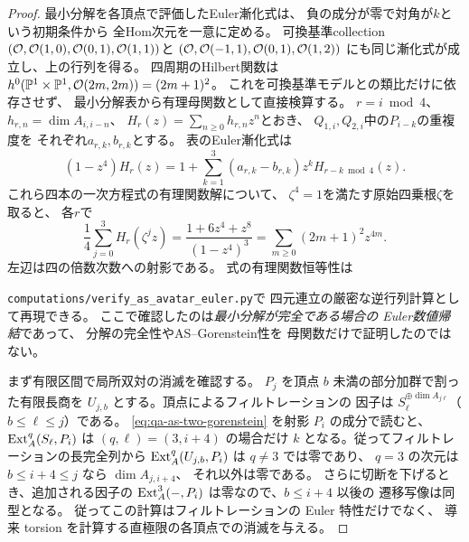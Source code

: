 \begin{proof}
最小分解を各頂点で評価したEuler漸化式は、
負の成分が零で対角が$k$という初期条件から
全Hom次元を一意に定める。
可換基準collection
$(\mathcal O,\mathcal O(1,0),\mathcal O(0,1),\mathcal O(1,1))$と
$(\mathcal O,\mathcal O(-1,1),\mathcal O(0,1),\mathcal O(1,2))$
にも同じ漸化式が成立し、上の行列を得る。
四周期のHilbert関数は
$h^0(\mathbb P^1\times\mathbb P^1,\mathcal O(2m,2m))=(2m+1)^2$。
これを可換基準モデルとの類比だけに依存させず、
最小分解表から有理母関数として直接検算する。
$r=i\bmod4$、$h_{r,n}=\dim A_{i,i-n}$、
$H_r(z)=\sum_{n\ge0}h_{r,n}z^n$とおき、
$Q_{1,i},Q_{2,i}$中の$P_{i-k}$の重複度を
それぞれ$a_{r,k},b_{r,k}$とする。
表のEuler漸化式は
\[
 (1-z^4)H_r(z)
 =1+\sum_{k=1}^3
 (a_{r,k}-b_{r,k})z^kH_{r-k\bmod4}(z).
 \tag{Euler4}\label{eq:qa-as-four-phase-euler}
\]
これら四本の一次方程式の有理関数解について、
$\zeta^4=1$を満たす原始四乗根$\zeta$を取ると、
各$r$で
\begin{equation}
 \frac14\sum_{j=0}^3H_r(\zeta^jz)
 =\frac{1+6z^4+z^8}{(1-z^4)^3}
 =\sum_{m\ge0}(2m+1)^2z^{4m}.
 \label{eq:qa-as-four-phase-rational-proof}
\end{equation}
左辺は四の倍数次数への射影である。
式の有理関数恒等性は

\noindent\texttt{computations/verify\_as\_avatar\_euler.py}で
四元連立の厳密な逆行列計算として再現できる。
ここで確認したのは\emph{最小分解が完全である場合の
Euler数値帰結}であって、
分解の完全性やAS--Gorenstein性を
母関数だけで証明したのではない。

まず有限区間で局所双対の消滅を確認する。
$P_j$ を頂点 $b$ 未満の部分加群で割った有限長商を
$U_{j,b}$ とする。頂点によるフィルトレーションの
因子は $S_\ell^{\oplus\dim A_{j\ell}}$（$b\le\ell\le j$）である。
\eqref{eq:qa-as-two-gorenstein} を射影 $P_i$ の成分で読むと、
$\operatorname{Ext}_A^q(S_\ell,P_i)$ は $(q,\ell)=(3,i+4)$ の場合だけ
$k$ となる。従ってフィルトレーションの長完全列から
$\operatorname{Ext}_A^q(U_{j,b},P_i)$ は $q\ne3$ では零であり、
$q=3$ の次元は $b\le i+4\le j$ なら $\dim A_{j,i+4}$、
それ以外は零である。
さらに切断を下げるとき、追加される因子の
$\operatorname{Ext}_A^3(-,P_i)$ は零なので、$b\le i+4$ 以後の
遷移写像は同型となる。
従ってこの計算はフィルトレーションの Euler 特性だけでなく、
導来 torsion を計算する直極限の各頂点での消滅を与える。


\end{proof}
